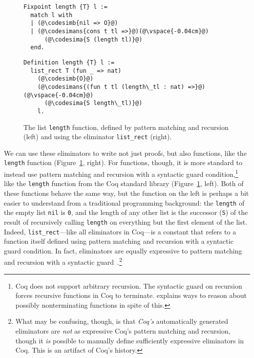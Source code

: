 \begin{figure}
\begin{minipage}{0.42\textwidth}
\begin{lstlisting}
Fixpoint length {T} l :=
  match l with
  | (@\codesimb{nil => O}@)
  | (@\codesimans{cons t tl =>}@)(@\vspace{-0.04cm}@)
      (@\codesima{S (length tl)}@)
  end.
\end{lstlisting}
\end{minipage}
\hfill
\begin{minipage}{0.54\textwidth}
\begin{lstlisting}
Definition length {T} l :=
  list_rect T (fun _ => nat)
    (@\codesimb{O}@)
    (@\codesimans{(fun t tl (length\_tl : nat) =>}@)(@\vspace{-0.04cm}@)
      (@\codesima{S length\_tl)}@)
    l.
\end{lstlisting}
\end{minipage}
\caption{The list \lstinline{length} function, defined by pattern matching and recursion (left) and using the eliminator \lstinline{list_rect} (right).}
\label{fig:length}
\end{figure}

We can use these eliminators to write not just proofs, but also functions, like the \lstinline{length} function (Figure~\ref{fig:length}, right).
For functions, though, it is more standard to instead use pattern matching and recursion with a 
syntactic guard condition,\footnote{Coq does not support arbitrary recursion. The syntactic guard on recursion forces recursive functions in Coq to terminate.  explains ways to reason about possibly nonterminating functions in spite of this.}
like the \lstinline{length} function from the Coq standard library (Figure~\ref{fig:length}, left).
Both of these functions behave the same way, but the function on the left is perhaps a bit easier to understand from a traditional programming background:
the \lstinline{length} of the empty list \lstinline{nil} is \lstinline{0}, and the length of any other list
is the successor (\lstinline{S}) of the result of recursively calling \lstinline{length} on everything but the first element of the list.
Indeed, \lstinline{list_rect}---like all eliminators in Coq---is a constant that refers to a function itself defined using pattern matching and recursion
with a syntactic guard condition.
In fact, eliminators are equally expressive to pattern matching and recursion with a syntactic guard~\cite{recursion-elimination, jesper}.\footnote{What may be confusing, though, is that \textit{Coq's} automatically 
generated eliminators are \textit{not} as expressive Coq's pattern matching and recursion, though it \textit{is} possible to manually define sufficiently expressive eliminators in Coq. This is an artifact of Coq's history.}

